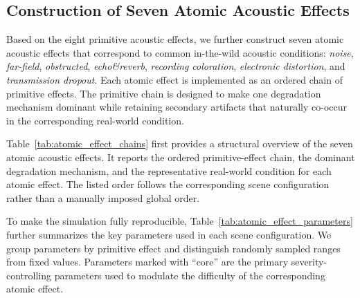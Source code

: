 \documentclass{article}
\begin{document}
\subsection{Construction of Seven Atomic Acoustic Effects}

Based on the eight primitive acoustic effects, we further construct seven
atomic acoustic effects that correspond to common in-the-wild acoustic
conditions: \textit{noise}, \textit{far-field}, \textit{obstructed},
\textit{echo\&reverb}, \textit{recording coloration},
\textit{electronic distortion}, and \textit{transmission dropout}. Each atomic
effect is implemented as an ordered chain of primitive effects. The primitive
chain is designed to make one degradation mechanism dominant while retaining
secondary artifacts that naturally co-occur in the corresponding real-world
condition.

Table~\ref{tab:atomic_effect_chains} first provides a structural overview of the
seven atomic acoustic effects. It reports the ordered primitive-effect chain,
the dominant degradation mechanism, and the representative real-world condition
for each atomic effect. The listed order follows the corresponding scene
configuration rather than a manually imposed global order.

To make the simulation fully reproducible, Table~\ref{tab:atomic_effect_parameters}
further summarizes the key parameters used in each scene configuration. We group
parameters by primitive effect and distinguish randomly sampled ranges from
fixed values. Parameters marked with ``core'' are the primary severity-controlling
parameters used to modulate the difficulty of the corresponding atomic effect.
\end{document}
